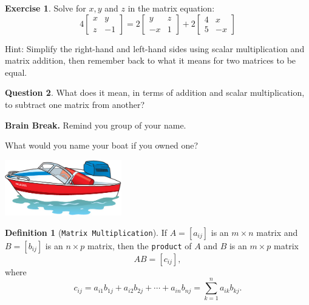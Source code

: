 \documentclass[handout]{beamer}
\newcommand{\fn}{\insertframenumber}
\theoremstyle{definition}
\newtheorem{exercise}{Exercise}
\newtheorem{question}[exercise]{Question}
\newtheorem*{defn}{Definition}
\renewcommand{\emph}[1]{{\color{blue}\texttt{#1}}}
\begin{document}
\begin{frame}{\fn}
	\begin{exercise}
		Solve for $x,y$ and $z$ in the matrix equation:	
		\[
			4\begin{bmatrix}
			x&y\\z&-1
			\end{bmatrix}
			=
			2\begin{bmatrix}
			y&z\\-x&1
			\end{bmatrix}
			+
			2\begin{bmatrix}
			4&x\\5&-x
			\end{bmatrix}
		\]
		
		Hint: Simplify the right-hand and left-hand sides using scalar multiplication and matrix addition, then remember back to what it means for two matrices to be equal.
	\end{exercise}
	\pause
	\begin{question}
		What does it mean, in terms of addition and scalar multiplication, to subtract one matrix from another?
	\end{question}
\end{frame}

\begin{frame}{\fn}
	\begin{block}{\textbf{Brain Break.}}
		Remind you group of your name.
		
		What would you name your boat if you owned one?
		
		\begin{center}
			\includegraphics[width=2in]{images/boat}
		\end{center}
	\end{block}
\end{frame}
\begin{frame}{\fn}
	\begin{defn}[\emph{Matrix Multiplication}]
		If $A=[a_{ij}]$ is an $m\times n$ matrix and $B=[b_{ij}]$ is an $n\times p$ matrix, then the \emph{product} of $A$ and $B$ is an $m\times p$ matrix 
		\[AB=[c_{ij}],\]
		where
		\[c_{ij}=a_{i1}b_{1j}+a_{i2}b_{2j}+\cdots+a_{in}b_{nj}=\sum_{k=1}^n a_{ik}b_{kj}.\]
	\end{defn}
\end{frame}
\end{document}
